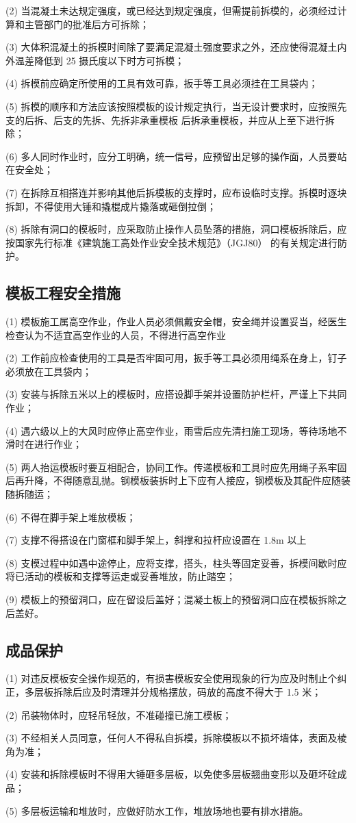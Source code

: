(2) 当混凝土未达规定强度，或已经达到规定强度，但需提前拆模的，必须经过计算和主管部门的批准后方可拆除；

(3) 大体积混凝土的拆模时间除了要满足混凝土强度要求之外，还应使得混凝土内外温差降低到 25 摄氏度以下时方可拆模；

(4) 拆模前应确定所使用的工具有效可靠，扳手等工具必须挂在工具袋内；

(5) 拆模的顺序和方法应该按照模板的设计规定执行，当无设计要求时，应按照先支的后拆、后支的先拆、先拆非承重模板
后拆承重模板，并应从上至下进行拆除；

(6) 多人同时作业时，应分工明确，统一信号，应预留出足够的操作面，人员要站在安全处；

(7) 在拆除互相搭连并影响其他后拆模板的支撑时，应布设临时支撑。拆模时逐块拆卸，不得使用大锤和撬棍成片撬落或砸倒拉倒；

(8) 拆除有洞口的模板时，应采取防止操作人员坠落的措施，洞口模板拆除后，应按国家先行标准《建筑施工高处作业安全技术规范》（JGJ80）
的有关规定进行防护。

\subsection{模板工程安全措施}

(1) 模板施工属高空作业，作业人员必须佩戴安全帽，安全绳并设置妥当，经医生检查认为不适宜高空作业的人员，不得进行高空作业

(2) 工作前应检查使用的工具是否牢固可用，扳手等工具必须用绳系在身上，钉子必须放在工具袋内；

(3) 安装与拆除五米以上的模板时，应搭设脚手架并设置防护栏杆，严谨上下共同作业；

(4) 遇六级以上的大风时应停止高空作业，雨雪后应先清扫施工现场，等待场地不滑时在进行作业；

(5) 两人抬运模板时要互相配合，协同工作。传递模板和工具时应先用绳子系牢固后再升降，不得随意乱抛。钢模板装拆时上下应有人接应，钢模板及其配件应随装随拆随运；

(6) 不得在脚手架上堆放模板；

(7) 支撑不得搭设在门窗框和脚手架上，斜撑和拉杆应设置在 1.8m 以上

(8) 支模过程中如遇中途停止，应将支撑，搭头，柱头等固定妥善，拆模间歇时应将已活动的模板和支撑等运走或妥善堆放，防止踏空；

(9) 模板上的预留洞口，应在留设后盖好；混凝土板上的预留洞口应在模板拆除之后盖好。

\subsection{成品保护}

(1) 对违反模板安全操作规范的，有损害模板安全使用现象的行为应及时制止个纠正，多层板拆除后应及时清理并分规格摆放，码放的高度不得大于 1.5 米；

(2) 吊装物体时，应轻吊轻放，不准碰撞已施工模板；

(3) 不经相关人员同意，任何人不得私自拆模，拆除模板以不损坏墙体，表面及棱角为准；

(4) 安装和拆除模板时不得用大锤砸多层板，以免使多层板翘曲变形以及砸坏硂成品；

(5) 多层板运输和堆放时，应做好防水工作，堆放场地也要有排水措施。

